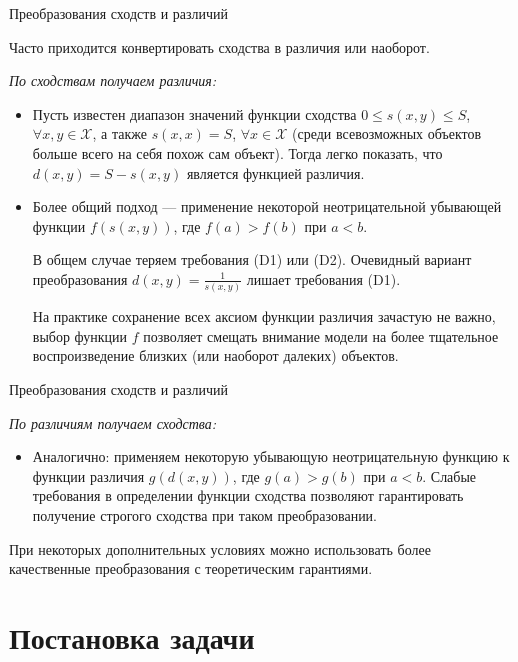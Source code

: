 \documentclass[9pt]{beamer}
\begin{document}
\begin{frame}{Преобразования сходств и различий}

Часто приходится конвертировать сходства в различия или наоборот.

\textit{По сходствам получаем различия:}
\begin{itemize}
\item Пусть известен диапазон значений функции сходства $0 \leqslant s(x, y) \leqslant S$, $\forall x,y \in \mathcal{X}$, а также $s(x, x) = S$, $\forall x \in \mathcal{X}$ (среди всевозможных объектов больше всего на себя похож сам объект). Тогда легко показать, что $d(x, y) = S - s(x, y)$ является функцией различия.
\item Более общий подход --- применение некоторой неотрицательной убывающей функции $f(s(x, y))$, где $f(a) > f(b)$ при $a < b$. 

В общем случае теряем требования (D1) или (D2). Очевидный вариант преобразования $d(x,y) = \frac{1}{s(x, y)}$ лишает требования (D1). 
\vspace{\baselineskip}

На практике сохранение всех аксиом функции различия зачастую не важно, выбор функции $f$ позволяет смещать внимание модели на более тщательное воспроизведение близких (или наоборот далеких) объектов.
\end{itemize}
    
\end{frame}

\begin{frame}{Преобразования сходств и различий}

\textit{По различиям получаем сходства:}
\begin{itemize}
\item Аналогично: применяем некоторую убывающую неотрицательную функцию к функции различия $g(d(x, y))$, где $g(a) > g(b)$ при $a < b$.
Слабые требования в определении функции сходства позволяют гарантировать получение строгого сходства при таком преобразовании.
\end{itemize}

\vspace{\baselineskip}
При некоторых дополнительных условиях можно использовать более качественные преобразования с теоретическим гарантиями.
    
\end{frame}

\section{Постановка задачи}
\end{document}
